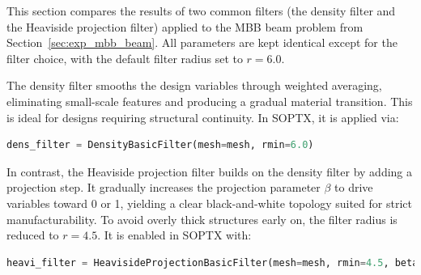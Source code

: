 \documentclass[mathpazo]{cicp}
\begin{document}
This section compares the results of two common filters (the density filter and the Heaviside projection filter) applied to the MBB beam problem from Section~\ref{sec:exp_mbb_beam}. All parameters are kept identical except for the filter choice, with the default filter radius set to $r=6.0$.

The density filter smooths the design variables through weighted averaging, eliminating small-scale features and producing a gradual material transition. This is ideal for designs requiring structural continuity. In SOPTX, it is applied via:
\vspace{-0.5ex} %
\begin{lstlisting}[language=python]
dens_filter = DensityBasicFilter(mesh=mesh, rmin=6.0)
\end{lstlisting}
\vspace{-0.5ex} %

In contrast, the Heaviside projection filter builds on the density filter by adding a projection step. It gradually increases the projection parameter $\beta$ to drive variables toward 0 or 1, yielding a clear black-and-white topology suited for strict manufacturability. To avoid overly thick structures early on, the filter radius is reduced to $r=4.5$. It is enabled in SOPTX with:
\vspace{-0.5ex} %
\begin{lstlisting}[language=python]
heavi_filter = HeavisideProjectionBasicFilter(mesh=mesh, rmin=4.5, beta=1, max_beta=512, continuation_iter=50)   
\end{lstlisting}
\vspace{-0.5ex} %
\end{document}
